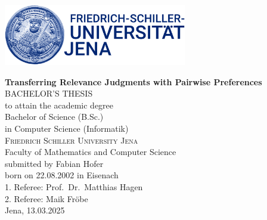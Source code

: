 \begingroup
  \thispagestyle{empty}
  \centering
  \vspace{1.5cm}
  \includegraphics[width=8cm]{./graphics/Bildmarke_blue_23cm.jpg}\par
  \centering
  \vspace{1.5cm}
  {\huge\bfseries Transferring Relevance Judgments with Pairwise Preferences \\[0.4cm]}
  \textsc{\Large BACHELOR'S THESIS}\\[1cm]
      \vspace{0.5cm}
      to attain the academic degree\\[0.4cm]
      Bachelor of Science (B.Sc.)\\[0.4cm]
      in Computer Science (Informatik)\\[2cm]
      \textsc{\Large Friedrich Schiller University Jena}\\[0.4cm]
      Faculty of Mathematics and Computer Science\\[1.5cm]

      submitted by Fabian Hofer\\[0.4cm]
      born on 22.08.2002 in Eisenach\\[0.4cm]
      1. Referee: Prof.~Dr.~Matthias Hagen\\[0.4cm]
      2. Referee: Maik Fröbe\\[0.4cm]
      Jena, 13.03.2025
      \vfill
\endgroup